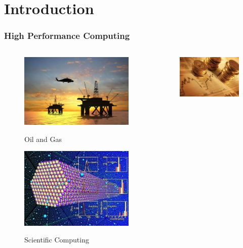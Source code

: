 \section{Introduction}

\begin{frame}
  \frametitle{High Performance Computing}
  \begin{columns}
    \begin{center}
      \begin{figure}
        \includegraphics[scale=0.2]{figs/oil-gas-industry.jpg}\\
        \caption{Oil and Gas}
      \end{figure}
      \begin{figure}
        \includegraphics[scale=0.3]{figs/scientific-computing.jpg}\\
        \caption{Scientific Computing}
      \end{figure}
    \end{center}
    \begin{center}
      \begin{figure}
        \includegraphics[scale=0.31]{figs/finance.jpg}\\

\end{figure}
\end{center}
\end{columns}
\end{frame}
